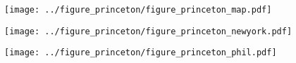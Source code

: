 \documentclass[12pt]{article}
\begin{document}
\pagebreak

\begin{figure}[!th]
\texttt{[image: ../figure\_princeton/figure\_princeton\_map.pdf]}
\end{figure}


\pagebreak

\begin{figure}[!th]
\texttt{[image: ../figure\_princeton/figure\_princeton\_newyork.pdf]}
\end{figure}


\pagebreak

\begin{figure}[!th]
\texttt{[image: ../figure\_princeton/figure\_princeton\_phil.pdf]}
\end{figure}
\end{document}

